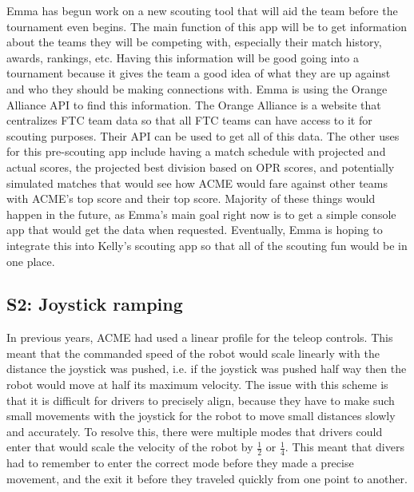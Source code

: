 \documentclass{article}
\begin{document}
Emma has begun work on a new scouting tool that will aid the team before the tournament even begins. The main function of this app will be to get information about the teams they will be competing with, especially their match history, awards, rankings, etc. Having this information will be good going into a tournament because it gives the team a good idea of what they are up against and who they should be making connections with. Emma is using the Orange Alliance API to find this information. The Orange Alliance is a website that centralizes FTC team data so that all FTC teams can have access to it for scouting purposes. Their API can be used to get all of this data. The other uses for this pre-scouting app include having a match schedule with projected and actual scores, the projected best division based on OPR scores, and potentially simulated matches that would see how ACME would fare against other teams with ACME's top score and their top score. Majority of these things would happen in the future, as Emma's main goal right now is to get a simple console app that would get the data when requested. Eventually, Emma is hoping to integrate this into Kelly's scouting app so that all of the scouting fun would be in one place. 

\subsection{S2: Joystick ramping}

In previous years, ACME had used a linear profile for the teleop controls. This meant that the commanded speed of the robot would scale linearly with the distance the joystick was pushed, i.e. if the joystick was pushed half way then the robot would move at half its maximum velocity. The issue with this scheme is that it is difficult for drivers to precisely align, because they have to make such small movements with the joystick for the robot to move small distances slowly and accurately. To resolve this, there were multiple modes that drivers could enter that would scale the velocity of the robot by $\frac{1}{2}$ or $\frac{1}{4}$. This meant that divers had to remember to enter the correct mode before they made a precise movement, and the exit it before they traveled quickly from one point to another. 
\end{document}
